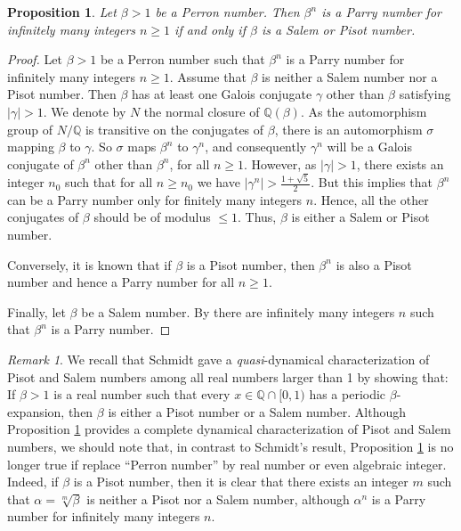 \documentclass[12pt]{article}
\theoremstyle{plain}
\newtheorem{proposition}[theorem]{Proposition}
\theoremstyle{remark}
\newtheorem{remark}[theorem]{Remark}
\begin{document}
\begin{proposition}\label{Mainprop}
 Let $\beta >1 $ be a Perron number. Then $\beta^n$ is a Parry number for infinitely many integers $n\geq 1$ if and only if $\beta $ is a Salem or Pisot number. 
\end{proposition}

\begin{proof}
Let $\beta >1 $ be a Perron number such that $\beta^n$ is a Parry number for infinitely many integers $n\geq 1$. Assume that $\beta $ is neither a Salem number nor a Pisot number. Then $\beta$ has at least one Galois conjugate $\gamma$ other than $\beta $ satisfying $\lvert\gamma \rvert >1$. We denote by $N$ the normal closure of $\mathbb{Q}(\beta)$. As the automorphism group of $N/\mathbb{Q}$ is transitive on the conjugates of $\beta$, there is an automorphism $\sigma$ mapping $\beta$ to $\gamma$. So $\sigma$ maps $ \beta^n$ to $\gamma^n$, and consequently $\gamma^n$ will be a Galois conjugate of $\beta^n$ other than $\beta ^n$, for all $n\geq 1$. However, as $\lvert\gamma \rvert >1$, there exists an integer $n_0$ such that for all $n\geq n_0$ we have $\lvert\gamma^n\rvert > \frac{1+\sqrt{5}}{2}$. But this implies that $\beta^n $ can be a Parry number only for finitely many integers $n$. Hence, all the other conjugates of $\beta $ should be of modulus $\leq 1$. Thus, $\beta$ is either a Salem or Pisot number.

 Conversely, it is known that if $\beta$ is a Pisot number, then $\beta^n$ is also a Pisot number and hence a Parry number for all $n\geq 1$.

 Finally, let $\beta$ be a Salem number.
 By \cite[Theorem 1]{aH22} there are infinitely many integers $n$ such that $\beta^n$ is a Parry number. 
\end{proof}

\begin{remark}
We recall that Schmidt \cite{Sch80} gave a \textit{quasi}-dynamical characterization of Pisot and Salem numbers among all real numbers larger than 1 by showing that: 
If $\beta>1$ is a real number such that every $x \in \mathbb{Q}\cap[0,1)$ has a periodic $\beta$-expansion, then $\beta$ is either a Pisot number or a Salem number. Although Proposition \ref{Mainprop} provides a complete dynamical characterization of Pisot and Salem numbers, we should note that, in contrast to Schmidt's result, Proposition \ref{Mainprop} is no longer true if replace ``Perron number'' by real number or even algebraic integer. Indeed, if $\beta $ is a Pisot number, then it is clear that there exists an integer $m$ such that $\alpha =\sqrt[m]{\beta}$ is neither a Pisot nor a Salem number, although $\alpha^n$ is a Parry number for infinitely many integers $n$.
\end{remark}
\end{document}

